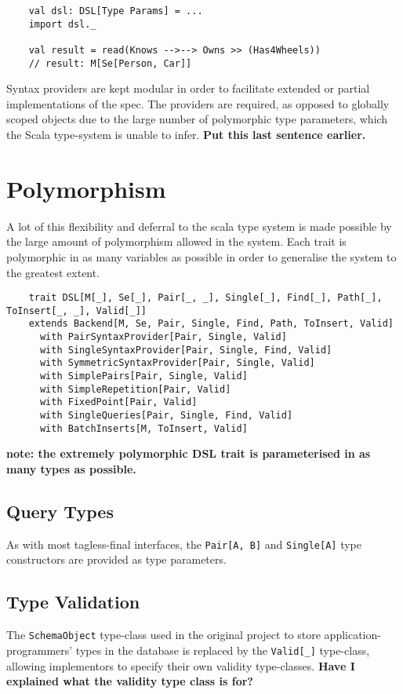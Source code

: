 \documentclass{report}
\newcommand \2[0]{\textbf{2}}
\newcommand \3[0]{\textbf{3}}
\newcommand{\todo}[1]{\textbf{#1}}
\begin{document}
\begin{verbatim}
    val dsl: DSL[Type Params] = ...
    import dsl._

    val result = read(Knows -->--> Owns >> (Has4Wheels))
    // result: M[Se[Person, Car]]
\end{verbatim}

Syntax providers are kept modular in order to facilitate extended or partial implementations of the spec. The providers are required, as opposed to globally scoped objects due to the large number of polymorphic type parameters, which the Scala type-system is unable to infer. \todo{Put this last sentence earlier.}


\section{Polymorphism}
A lot of this flexibility and deferral to the scala type system is made possible by the large amount of polymorphism allowed in the system. Each trait is polymorphic in as many variables as possible in order to generalise the system to the greatest extent.


\begin{verbatim}
    trait DSL[M[_], Se[_], Pair[_, _], Single[_], Find[_], Path[_], ToInsert[_, _], Valid[_]]
    extends Backend[M, Se, Pair, Single, Find, Path, ToInsert, Valid]
      with PairSyntaxProvider[Pair, Single, Valid]
      with SingleSyntaxProvider[Pair, Single, Find, Valid]
      with SymmetricSyntaxProvider[Pair, Single, Valid]
      with SimplePairs[Pair, Single, Valid]
      with SimpleRepetition[Pair, Valid]
      with FixedPoint[Pair, Valid]
      with SingleQueries[Pair, Single, Find, Valid]
      with BatchInserts[M, ToInsert, Valid]
\end{verbatim}
\todo{note: the extremely polymorphic DSL trait is parameterised in as many types as possible.}

\subsection{Query Types}
As with most tagless-final interfaces, the \texttt{Pair[A, B]} and \texttt{Single[A]} type constructors are provided as type parameters.
\subsection{Type Validation}
The \texttt{SchemaObject} type-class used in the original project to store application-programmers' types in the database is replaced by the \texttt{Valid[_]} type-class, allowing implementors to specify their own validity type-classes.
\todo{Have I explained what the validity type class is for?}
\end{document}
